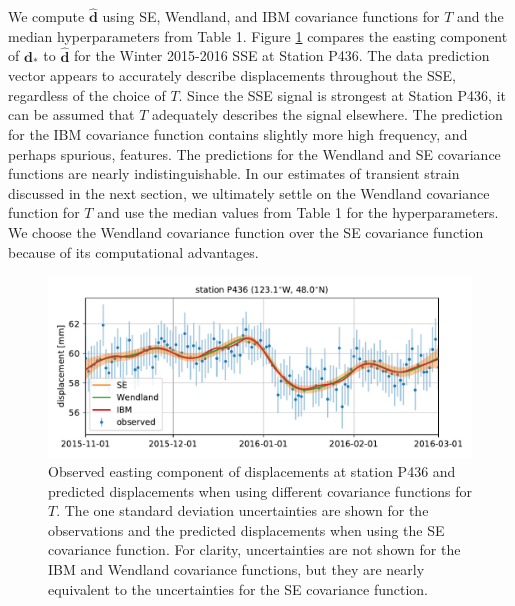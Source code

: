 \documentclass[10pt,letter]{article}
\begin{document}
We compute $\hat{\bm{d}}$ using SE, Wendland, and IBM covariance functions for $T$ and the median hyperparameters from Table 1. Figure \ref{fig:Fit} compares the easting component of $\bm{d}_*$ to $\hat{\bm{d}}$ for the Winter 2015-2016 SSE at Station P436. The data prediction vector appears to accurately describe displacements throughout the SSE, regardless of the choice of $T$. Since the SSE signal is strongest at Station P436, it can be assumed that $T$ adequately describes the signal elsewhere. The prediction for the IBM covariance function contains slightly more high frequency, and perhaps spurious, features. The predictions for the Wendland and SE covariance functions are nearly indistinguishable. In our estimates of transient strain discussed in the next section, we ultimately settle on the Wendland covariance function for $T$ and use the median values from Table 1 for the hyperparameters. We choose the Wendland covariance function over the SE covariance function because of its computational advantages.     

\begin{figure}
\includegraphics{figures/signal_fit/signal-fit.pdf}
\caption{Observed easting component of displacements at station P436 and predicted displacements when using different covariance functions for $T$. The one standard deviation uncertainties are shown for the observations and the predicted displacements when using the SE covariance function. For clarity, uncertainties are not shown for the IBM and Wendland covariance functions, but they are nearly equivalent to the uncertainties for the SE covariance function.}   
\label{fig:Fit}
\end{figure}
\end{document}
